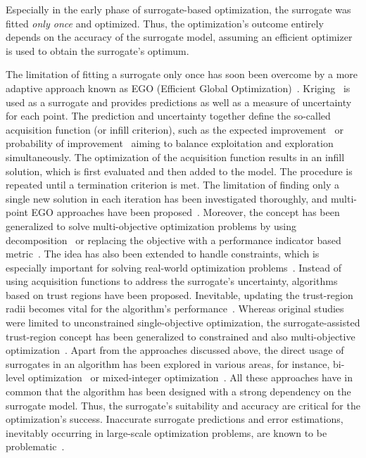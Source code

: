 \documentclass[journal]{IEEEtran}
\begin{document}
Especially in the early phase of surrogate-based optimization, the surrogate was fitted \emph{only once} and optimized. Thus, the optimization's outcome entirely depends on the accuracy of the surrogate model, assuming an efficient optimizer is used to obtain the surrogate's optimum.



The limitation of fitting a surrogate only once has soon been overcome by a more adaptive approach known as EGO (Efficient Global Optimization)~\cite{1998-jones-ego}.
Kriging~\cite{1951-krige-mine} is used as a surrogate and provides predictions as well as a measure of uncertainty for each point. The prediction and uncertainty together define the so-called acquisition function (or infill criterion), such as the expected improvement~\cite{1998-jones-ego} or probability of improvement~\cite{2001-jones-tax-ego} aiming to balance exploitation and exploration simultaneously. The optimization of the acquisition function results in an infill solution, which is first evaluated and then added to the model. The procedure is repeated until a termination criterion is met. The limitation of finding only a single new solution in each iteration has been investigated thoroughly, and multi-point EGO approaches have been proposed~\cite{2010-viana-ego-parallel,2019-beaucaire-ego-multi-point,2020-berveglieri-parallel}.
Moreover, the concept has been generalized to solve multi-objective optimization problems by using decomposition~\cite{2006-knowles-parego,2010-zhang-moead-ego} or replacing the objective with a performance indicator based metric~\cite{2008-ponweiser-sms-ego}. The idea has also been extended to handle constraints, which is especially important for solving real-world optimization problems~\cite{2017-bagheri-constr-ego}.
Instead of using acquisition functions to address the surrogate's uncertainty, algorithms based on trust regions have been proposed.
Inevitable, updating the trust-region radii becomes vital for the algorithm's performance~\cite{2003-ong-evolution-expensive}. Whereas original studies were limited to unconstrained single-objective optimization, the surrogate-assisted trust-region concept has been generalized to constrained and also multi-objective optimization~\cite{2010-lim-generalizing,2020-cai-generalied-high-dim}.
Apart from the approaches discussed above, the direct usage of surrogates in an algorithm has been explored in various areas, for instance, bi-level optimization~\cite{2006-ong-max-min,2017-islam-sabla-bilevel} or mixed-integer optimization~\cite{2016-mueller-miso}.
All these approaches have in common that the algorithm has been designed with a strong dependency on the surrogate model. Thus, the surrogate's suitability and accuracy are critical for the optimization's success. Inaccurate surrogate predictions and error estimations, inevitably occurring in large-scale optimization problems, are known to be problematic~\cite{2020-stork-issues}.
\end{document}
